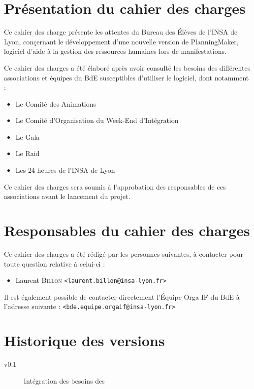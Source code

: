 \section{Présentation du cahier des charges}
Ce cahier des charge présente les attentes du Bureau des Élèves de l'INSA de Lyon, conçernant le développement d'une nouvelle version de PlanningMaker, logiciel
d'aide à la gestion des ressources humaines lors de manifestations.

Ce cahier des charges a été élaboré après avoir consulté les besoins des différentes associations et équipes du BdE susceptibles d'utiliser le logiciel, dont notamment : 
\begin{itemize}
\item Le Comité des Animations
\item Le Comité d'Organisation du Week-End d'Intégration
\item Le Gala
\item Le Raid
\item Les 24 heures de l'INSA de Lyon
\end{itemize}

Ce cahier des charges sera soumis à l'approbation des responsables de ces associations avant le lancement du projet.

\section{Responsables du cahier des charges}
Ce cahier des charges a été rédigé par les personnes suivantes, à contacter pour toute question relative à celui-ci : 
\begin{itemize}
 \item Laurent \textsc{Billon} \texttt{<laurent.billon@insa-lyon.fr>}
\end{itemize}

Il est également possible de contacter directement l'Équipe Orga IF du BdE à l'adresse suivante : \texttt{<bde.equipe.orgaif@insa-lyon.fr>}

\section{Historique des versions}

\begin{description}
\item[v0.1] Intégration des besoins des 
\end{description}